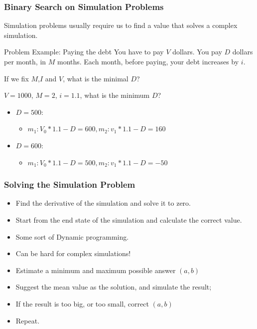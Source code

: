 \documentclass{beamer}
\begin{document}
\begin{frame}
  \frametitle{Binary Search on Simulation Problems}

  Simulation problems usually require us to find a value that solves
  a complex simulation.

  \begin{block}{Problem Example: Paying the debt}
    You have to pay $V$ dollars. You pay $D$ dollars per month, in $M$
    months. Each month, before paying, your debt increases by $i$.

    \medskip

    If we fix $M$,$I$ and $V$, what is the minimal $D$?
  \end{block}

  \bigskip

  $V = 1000$, $M = 2$, $i = 1.1$, what is the minimum $D$?

  \begin{itemize}
  \item $D = 500$:
    \begin{itemize}
    \item $m_1: V_0 *1.1 - D = 600, m_2: v_1*1.1 - D = 160$
    \end{itemize}
  \item $D = 600$:
    \begin{itemize}
    \item $m_1: V_0 *1.1 - D = 500, m_2: v_1*1.1 - D = -50$
    \end{itemize}
  \end{itemize}
\end{frame}

\begin{frame}
  \frametitle{Solving the Simulation Problem}

  \begin{itemize}
  \item Find the derivative of the simulation and solve it to zero.
  \item Start from the end state of the simulation and calculate the correct value.
  \item Some sort of Dynamic programming.
  \item \alert{Can be hard for complex simulations!}
  \end{itemize}

  \bigskip

  \begin{itemize}
  \item Estimate a minimum and maximum possible answer $(a,b)$
  \item Suggest the mean value as the solution, and simulate the result;
  \item If the result is too big, or too small, correct $(a,b)$
  \item Repeat.
  \end{itemize}
\end{frame}
\end{document}
